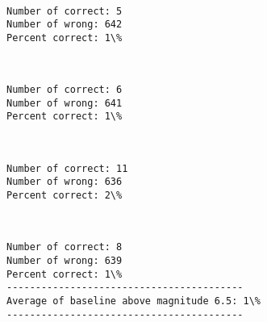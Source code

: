 \documentclass[11pt]{article}
\begin{document}
    \begin{center}
    \end{center}
    { \hspace*{\fill} \\}
    
    \begin{Verbatim}[commandchars=\\\{\}]
Number of correct: 5
Number of wrong: 642
Percent correct: 1\%

    \end{Verbatim}

    \begin{center}
    \end{center}
    { \hspace*{\fill} \\}
    
    \begin{Verbatim}[commandchars=\\\{\}]
Number of correct: 6
Number of wrong: 641
Percent correct: 1\%

    \end{Verbatim}

    \begin{center}
    \end{center}
    { \hspace*{\fill} \\}
    
    \begin{Verbatim}[commandchars=\\\{\}]
Number of correct: 11
Number of wrong: 636
Percent correct: 2\%

    \end{Verbatim}

    \begin{center}
    \end{center}
    { \hspace*{\fill} \\}
    
    \begin{Verbatim}[commandchars=\\\{\}]
Number of correct: 8
Number of wrong: 639
Percent correct: 1\%
-----------------------------------------
Average of baseline above magnitude 6.5: 1\%
-----------------------------------------

    \end{Verbatim}
\end{document}
